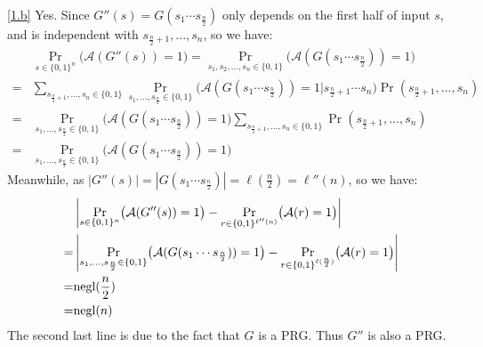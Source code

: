 \documentclass{homework}
\begin{document}
\begin{solution}
\ref{1.b} Yes. Since $G''(s)=G(s_{1}\cdots s_{\frac{n}{2}})$ only depends on the first half of input $s$, and is independent with $s_{\frac{n}{2}+1},..., s_n$, so we have:
\begin{align*}
  &\Pr_{s\in\{0,1\}^n}\bigl(\mathcal{A}(G''(s))=1\bigr) = \Pr_{s_1,s_2,...,s_n\in\{0,1\}}\bigl(\mathcal{A}(G(s_{1}\cdots s_{\frac{n}{2}}))=1\bigr)\\
  =& \sum_{s_{\frac{n}{2}+1},..., s_n\in\{0,1\}}\Pr_{s_1,...,s_{\frac{n}{2}}\in\{0,1\}}\bigl(\mathcal{A}(G(s_{1} \cdots s_{\frac{n}{2}}))=1\big| s_{\frac{n}{2}+1} \cdots s_n\bigr)\Pr(s_{\frac{n}{2}+1},...,s_n)\\
  =&\Pr_{s_1,...,s_{\frac{n}{2}}\in\{0,1\}}\bigl(\mathcal{A}(G(s_{1} \cdots s_{\frac{n}{2}}))=1\bigr)\sum_{s_{\frac{n}{2}+1},..., s_n\in\{0,1\}} \Pr(s_{\frac{n}{2}+1},...,s_n)\\
  =&\Pr_{s_1,...,s_{\frac{n}{2}}\in\{0,1\}}\bigl(\mathcal{A}(G(s_{1} \cdots s_{\frac{n}{2}}))=1\bigr)
\end{align*}
Meanwhile, as $|G''(s)| = |G(s_1\cdots s_{\frac{n}{2}})| = \ell(\frac{n}{2}) = \ell''(n)$, so we have:
\begin{align*}
  &\left\lvert \Pr_{s\in\{0,1\}^n}\bigl(\mathcal{A}(G''(s))=1\bigr) - \Pr_{r\in\{0,1\}^{\ell''(n)}}\bigl(\mathcal{A}(r)=1\bigr) \right\rvert\\
  =& \left\lvert \Pr_{s_1,...,s_{\frac{n}{2}}\in\{0,1\}}\bigl(\mathcal{A}(G(s_{1} \cdots s_{\frac{n}{2}}))=1\bigr) - \Pr_{r\in\{0,1\}^{\ell(\frac{n}{2})}}\bigl(\mathcal{A}(r)=1\bigr) \right\rvert\\
  =&\text{negl}(\frac{n}{2})\\
  =&\text{negl}(n)
\end{align*}
The second last line is due to the fact that $G$ is a PRG. Thus $G''$ is also a PRG.
\end{solution}
\end{document}
